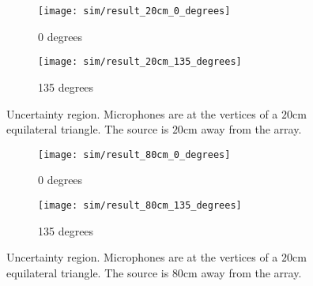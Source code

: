 \begin{figure*}[]
  \centering
  \begin{subfigure}[]{.48\textwidth}
    \texttt{[image: sim/result\_20cm\_0\_degrees]}
    \caption{0 degrees}
  \end{subfigure}
  \begin{subfigure}[]{.48\textwidth}
    \texttt{[image: sim/result\_20cm\_135\_degrees]}
    \caption{135 degrees}
  \end{subfigure}
  \caption{Uncertainty region. Microphones are at the vertices of a $20$cm equilateral triangle. The source is $20$cm away from the array.}
  \label{fig:sim_3_2}
\end{figure*}

\begin{figure*}[]
  \centering
  \begin{subfigure}[]{.48\textwidth}
    \texttt{[image: sim/result\_80cm\_0\_degrees]}
    \caption{0 degrees}
  \end{subfigure}
  \begin{subfigure}[]{.48\textwidth}
    \texttt{[image: sim/result\_80cm\_135\_degrees]}
    \caption{135 degrees}
  \end{subfigure}
  \caption{Uncertainty region. Microphones are at the vertices of a $20$cm equilateral triangle. The source is $80$cm away from the array.}
  \label{fig:sim_3_8}
\end{figure*}

